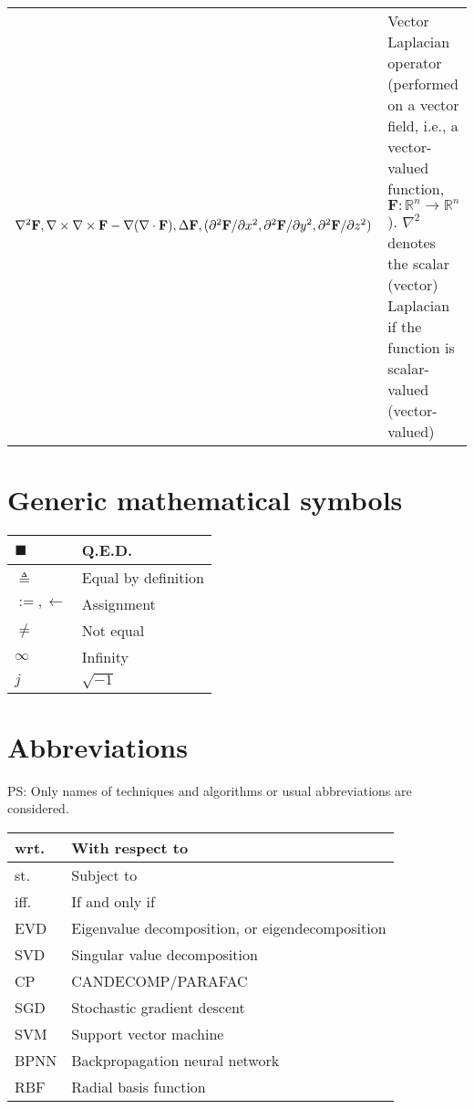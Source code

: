 \documentclass{article}
\begin{document}
\begin{xltabular}{\textwidth}{XX}
    \(\nabla^2 \mathbf{F}, \nabla \times \nabla \times \mathbf{F} - \nabla(\nabla \cdot \mathbf{F}), \Delta \mathbf{F}, \newline (\partial^2\mathbf{F}/\partial x^2 , \partial^2\mathbf{F}/\partial y^2 , \partial^2\mathbf{F}/\partial z^2)\) & Vector Laplacian operator (performed on a vector field, i.e., a vector-valued function, \(\mathbf{F}: \mathbb{R}^{n} \rightarrow \mathbb{R}^{n}\)). \(\nabla^2\) denotes the scalar (vector) Laplacian if the function is scalar-valued (vector-valued)\\
\end{xltabular}

\section{Generic mathematical symbols}
\begin{xltabular}{\textwidth}{XX}
    \(\blacksquare\) & Q.E.D. \\ \hline
    \(\triangleq\) & Equal by definition\\ \hline
    \(:=, \leftarrow\) & Assignment \cite{rosenDiscreteMathematicsIts2011}\\ \hline
    \(\neq\) & Not equal\\ \hline
    \(\infty\) & Infinity\\ \hline
    \(j\) & \(\sqrt{-1}\)\\
\end{xltabular}

\section{Abbreviations}
PS: Only names of techniques and algorithms or usual abbreviations are considered.
\begin{xltabular}{\textwidth}{XX}
    wrt. & With respect to\\ \hline
    st. & Subject to\\ \hline
    iff. & If and only if\\ \hline
    EVD & Eigenvalue decomposition, or eigendecomposition \cite{nossekAdaptiveArraySignal2015}\\ \hline
    SVD & Singular value decomposition\\ \hline
    CP & CANDECOMP/PARAFAC\\ \hline
    SGD & Stochastic gradient descent\\ \hline
    SVM & Support vector machine\\ \hline
    BPNN & Backpropagation neural network \cite{jiaoAutomaticEquatorialGPS2017}\\ \hline
    RBF & Radial basis function\\ \hline
\end{xltabular}

\printbibliography
\end{document}
